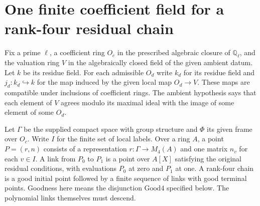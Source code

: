 \section{One finite coefficient field for a rank-four residual chain}
Fix a prime $\ell$, a coefficient ring $O_c$ in the prescribed algebraic
closure of $\mathbb Q_\ell$, and the valuation ring $V$ in the
algebraically closed field of the given ambient datum. Let $k$ be its residue field. For each admissible $O_d$ write
$k_d$ for its residue field and $j_d:k_d\hookrightarrow k$ for the map
induced by the given local map $O_d\to V$. These maps are compatible
under inclusions of coefficient rings. The ambient hypothesis says that
each element of $V$ agrees modulo its maximal ideal with the image of
some element of some $O_d$.

Let $\Gamma$ be the supplied compact space with group structure and
$\Phi$ its given frame over $O_c$. Write $I$ for the finite set of local
labels. Over a ring $A$, a point $P=(r,n)$ consists of a representation
$r:\Gamma\to M_4(A)$ and one matrix $n_v$ for each $v\in I$. A link
from $P_0$ to $P_1$ is a point over $A[X]$ satisfying the original
residual conditions, with evaluations $P_0$ at zero and $P_1$ at one.
A rank-four chain is a good initial point followed by a finite sequence
of links with good terminal points. Goodness here means the disjunction
$\mathrm{Good4}$ specified below. The polynomial links themselves must
descend.


